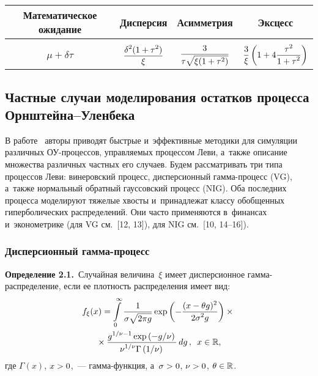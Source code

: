 \begin{multicols}{2}
\begin{table*}[b]
\begin{center}
                \begin{tabular}{|c|c|c|c|}
                        \hline
                        Математическое ожидание & 
                                                Дисперсия &
                                                                        Асимметрия &
                                    Эксцесс \\
 \hline
 &&&\\[-9pt]
 $\mu + \delta \tau$ &
 $\displaystyle\displaystyle\frac{\displaystyle \delta^2(1 + \tau^2)\mathstrut}{\displaystyle \xi\mathstrut}$ 
& $\displaystyle\displaystyle\frac{\displaystyle 3\mathstrut}{\displaystyle \tau \sqrt{\xi (1 + \tau^2)}\mathstrut}$ 
& $\displaystyle\displaystyle\frac{\displaystyle 3\mathstrut}{\displaystyle \xi\mathstrut} \left(  1 + 4 \displaystyle\frac{\displaystyle \tau^2\mathstrut}{\displaystyle 1 + \tau^2\mathstrut}  \right)$  \\[8pt]
                        \hline
                \end{tabular}
        \end{center}
\end{table*}
        

\subsection{Частные случаи моделирования остатков процесса Орнштейна--Уленбека}

В работе~\cite{taufer} авторы приводят быстрые и~эффективные методики для 
симуляции различных ОУ-про\-цес\-сов, управляемых процессом Леви, а~также  
описание множества различных частных его случаев. Будем рассматривать три типа 
процессов Леви: винеровский процесс, дисперсионный гам\-ма-про\-цесс (VG), а~также 
нормальный обратный гауссовский процесс (NIG).  Оба последних процесса 
моделируют тяжелые хвосты и~принадлежат классу обобщенных гиперболических 
распределений. Они часто применяются в~финансах и~эконометрике (для 
VG см.~[12,  13]), для NIG см.~[10, 14--16]).

\subsubsection {Дисперсионный гамма-процесс}

\noindent
\textbf{Определение 2.1.}\
Случайная величина~$\xi$ имеет дисперсионное гам\-ма-рас\-пре\-де\-ле\-ние, 
если ее плотность распределения имеет вид:
\begin{multline} \label{vgpdf}
 f_\xi(x) = \int\limits_{0}^{\infty} \displaystyle\frac{\displaystyle 1\mathstrut}{\displaystyle \sigma  \sqrt{2 \pi g}\mathstrut} 
 \exp \left( - \displaystyle\frac{\displaystyle (x - \theta g)^2\mathstrut}{\displaystyle 2 \sigma^2 g\mathstrut}  \right) \times{}\\
 {}\times
\displaystyle\frac{\displaystyle g ^{{1}/{\nu} - 1} \exp \left( - {g}/{\nu} \right)\mathstrut}{\displaystyle \nu  ^{{1}/{\nu}} \Gamma \left({1}/{\nu}\right) \mathstrut}\, dg\,,\enskip x \in \mathbb{R},
                \end{multline}
                где $\Gamma (x)$, $x\hm>0$,~--- гам\-ма-функ\-ция, 
                а~$\sigma \hm> 0$, $\nu \hm> 0$,  
$\theta \hm\in \mathbb{R}$.



\end{multicols}
